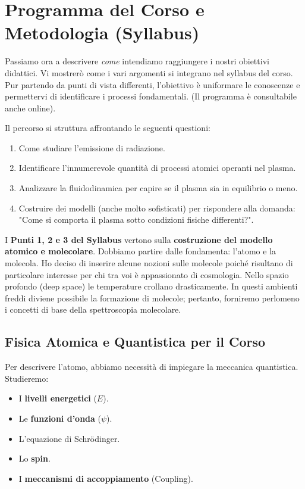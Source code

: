 \section{Programma del Corso e Metodologia (Syllabus)}

Passiamo ora a descrivere \textit{come} intendiamo raggiungere i nostri obiettivi didattici. Vi mostrerò come i vari argomenti si integrano nel syllabus del corso. Pur partendo da punti di vista differenti, l'obiettivo è uniformare le conoscenze e permettervi di identificare i processi fondamentali. (Il programma è consultabile anche online).

Il percorso si struttura affrontando le seguenti questioni:
\begin{enumerate}
    \item Come studiare l'emissione di radiazione.
    \item Identificare l'innumerevole quantità di processi atomici operanti nel plasma.
    \item Analizzare la fluidodinamica per capire se il plasma sia in equilibrio o meno.
    \item Costruire dei modelli (anche molto sofisticati) per rispondere alla domanda: "Come si comporta il plasma sotto condizioni fisiche differenti?".
\end{enumerate}

I \textbf{Punti 1, 2 e 3 del Syllabus} vertono sulla \textbf{costruzione del modello atomico e molecolare}.
Dobbiamo partire dalle fondamenta: l'atomo e la molecola. Ho deciso di inserire alcune nozioni sulle molecole poiché risultano di particolare interesse per chi tra voi è appassionato di cosmologia. Nello spazio profondo (deep space) le temperature crollano drasticamente. In questi ambienti freddi diviene possibile la formazione di molecole; pertanto, forniremo perlomeno i concetti di base della spettroscopia molecolare.

    \subsection{Fisica Atomica e Quantistica per il Corso}
    
    Per descrivere l'atomo, abbiamo necessità di impiegare la meccanica quantistica. Studieremo:
    \begin{itemize}
        \item I \textbf{livelli energetici} ($E$).
        \item Le \textbf{funzioni d'onda} ($\psi$).
        \item L'equazione di Schrödinger.
        \item Lo \textbf{spin}.
        \item I \textbf{meccanismi di accoppiamento} (Coupling).
    \end{itemize}
    
